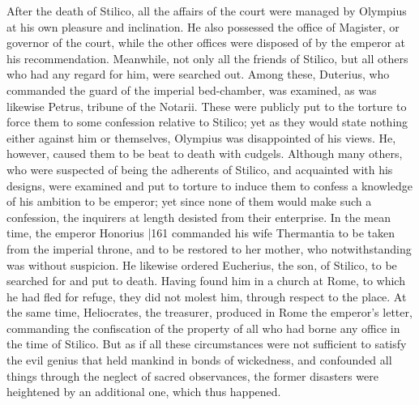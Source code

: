 After the death of Stilico, all the affairs of the court were managed by Olympius at his own pleasure and inclination. He also possessed the office of Magister, or governor of the court, while the other offices were disposed of by the emperor at his recommendation. Meanwhile, not only all the friends of Stilico, but all others who had any regard for him, were searched out. Among these, Duterius, who commanded the guard of the imperial bed-chamber, was examined, as was likewise Petrus, tribune of the Notarii. These were publicly put to the torture to force them to some confession relative to Stilico; yet as they would state nothing either against him or themselves, Olympius was disappointed of his views. He, however, caused them to be beat to death with cudgels. Although many others, who were suspected of being the adherents of Stilico, and acquainted with his designs, were examined and put to torture to induce them to confess a knowledge of his ambition to be emperor; yet since none of them would make such a confession, the inquirers at length desisted from their enterprise. In the mean time, the emperor Honorius
|161 commanded his wife Thermantia to be taken from the imperial throne, and to be restored to her mother, who notwithstanding was without suspicion. He likewise ordered Eucherius, the son, of Stilico, to be searched for and put to death. Having found him in a church at Rome, to which he had fled for refuge, they did not molest him, through respect to the place. At the same time, Heliocrates, the treasurer, produced in Rome the emperor's letter, commanding the confiscation of the property of all who had borne any office in the time of Stilico. But as if all these circumstances were not sufficient to satisfy the evil genius that held mankind in bonds of wickedness, and confounded all things through the neglect of sacred observances, the former disasters were heightened by an additional one, which thus happened.

